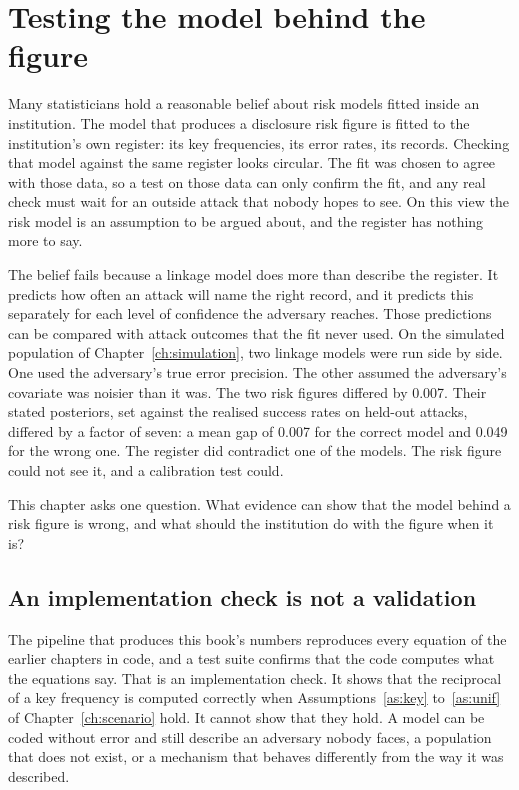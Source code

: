 \chapter{Testing the model behind the figure}\label{ch:falsification}

Many statisticians hold a reasonable belief about risk models fitted inside an
institution. The model that produces a disclosure risk figure is fitted to the
institution's own register: its key frequencies, its error rates, its records.
Checking that model against the same register looks circular. The fit was chosen
to agree with those data, so a test on those data can only confirm the fit, and
any real check must wait for an outside attack that nobody hopes to see. On this
view the risk model is an assumption to be argued about, and the register has
nothing more to say.

The belief fails because a linkage model does more than describe the register. It
predicts how often an attack will name the right record, and it predicts this
separately for each level of confidence the adversary reaches. Those predictions
can be compared with attack outcomes that the fit never used. On the simulated
population of Chapter~\ref{ch:simulation}, two linkage models were run side by side.
One used the adversary's true error precision. The other assumed the adversary's
covariate was noisier than it was. The two risk figures differed by 0.007. %
Their stated posteriors, set against the realised success rates on held-out
attacks, differed by a factor of seven: a mean gap of 0.007 for the correct model
and 0.049 for the wrong one. %
The register did contradict one of the models. The risk figure could not see it,
and a calibration test could.

This chapter asks one question. What evidence can show that the model behind a
risk figure is wrong, and what should the institution do with the figure when it
is?

\section{An implementation check is not a validation}

The pipeline that produces this book's numbers reproduces every equation of the
earlier chapters in code, and a test suite confirms that the code computes what the
equations say. That is an implementation check. It shows that the reciprocal of a
key frequency is computed correctly when Assumptions~\ref{as:key} to~\ref{as:unif}
of Chapter~\ref{ch:scenario} hold. It cannot show that they hold. A model can be
coded without error and still describe an adversary nobody faces, a population
that does not exist, or a mechanism that behaves differently from the way it was
described.

